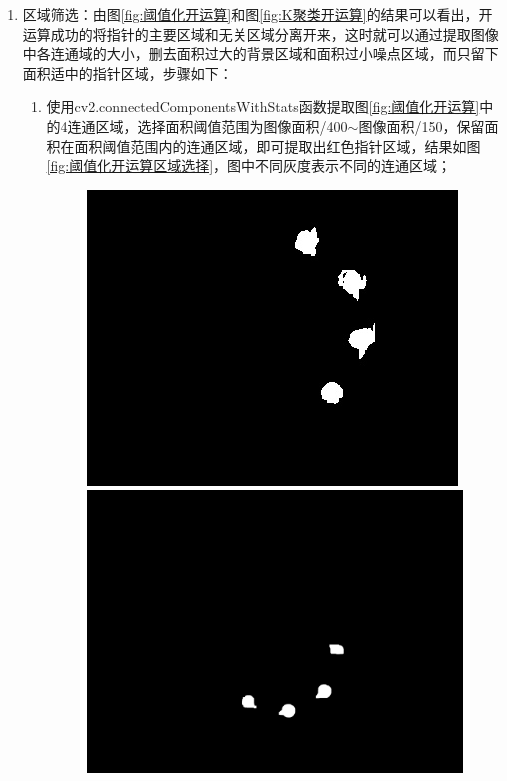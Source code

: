 \documentclass[a4paper]{ctexart}
\begin{document}
\begin{enumerate}[label=\arabic*、]
	\item 区域筛选：由图\ref{fig:阈值化开运算}和图\ref{fig:K聚类开运算}的结果可以看出，开运算成功的将指针的主要区域和无关区域分离开来，这时就可以通过提取图像中各连通域的大小，删去面积过大的背景区域和面积过小噪点区域，而只留下面积适中的指针区域，步骤如下：
	\begin{enumerate}[label=\alph*)]
		\item 使用cv2.connectedComponentsWithStats函数提取图\ref{fig:阈值化开运算}中的4连通区域，选择面积阈值范围为图像面积/400$\sim$图像面积/150，保留面积在面积阈值范围内的连通区域，即可提取出红色指针区域，结果如图\ref{fig:阈值化开运算区域选择}，图中不同灰度表示不同的连通区域；
		\begin{figure}[htbp]
			\centering
			\begin{minipage}[t]{0.25\textwidth}
				\centering
				\includegraphics[width=\textwidth]{figure/drop_1/img1.jpg}
			\end{minipage}
			\begin{minipage}[t]{0.25\textwidth}
				\centering
				\includegraphics[width=\textwidth]{figure/drop_1/img2.jpg}

\end{minipage}
\end{figure}
\end{enumerate}
\end{enumerate}
\end{document}
